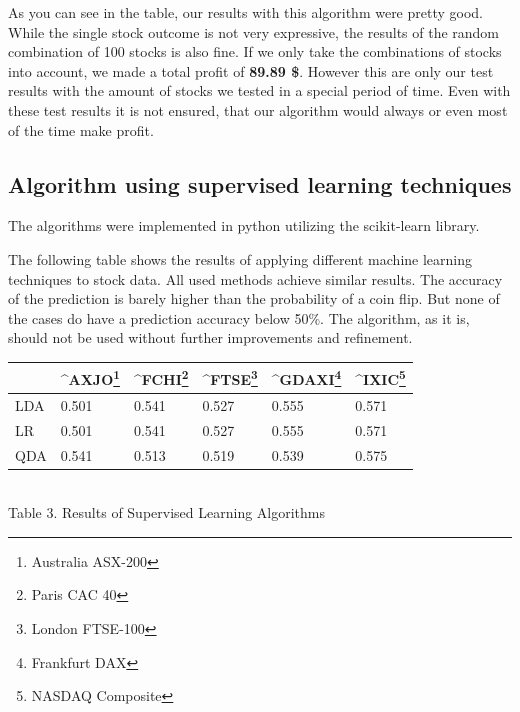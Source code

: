 \documentclass[conference]{IEEEtran}
\begin{document}
As you can see in the table, our results with this algorithm were pretty good. While the single stock outcome is not very expressive, the results of the random combination of 100 stocks is also fine. If we only take the combinations of stocks into account, we made a total profit of \textbf{89.89 \$}. However this are only our test results with the amount of stocks we tested in a special period of time. Even with these test results it is not ensured, that our algorithm would always or even most of the time make profit.

\subsection{Algorithm using supervised learning techniques}

The algorithms were implemented in python utilizing the scikit-learn library.

The following table shows the results of applying different machine learning techniques to stock data. All used methods achieve similar results. The accuracy of the prediction is barely higher than the probability of a coin flip. But none of the cases do have a prediction accuracy below 50\%. The algorithm, as it is, should not be used without further improvements and refinement. 
\\
\begin{center}
\begin{tabularx}{0.5\textwidth}{|X|X|X|X|X|X|}
\hline
{} &     
\^{}AXJO\footnote{Australia ASX-200} &     
\^{}FCHI\footnote{Paris CAC 40} &     
\^{}FTSE\footnote{London FTSE-100} &    
\^{}GDAXI\footnote{Frankfurt DAX} & 
\^{}IXIC\footnote{NASDAQ Composite}\\
\hline
LDA &  0.501 &  0.541 &  0.527 &  0.555 & 0.571\\
LR  &  0.501 &  0.541 &  0.527 &  0.555 & 0.571\\
QDA &  0.541 &  0.513 &  0.519 &  0.539 & 0.575\\
\hline
\end{tabularx}
\\[5pt]
Table 3. Results of Supervised Learning Algorithms
\end{center}

\end{document}
